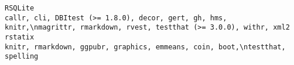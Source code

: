 \documentclass[
  letterpaper,
  DIV=11,
  numbers=noendperiod]{scrreprt}
\begin{document}
\begin{verbatim}
RSQLite                                                                                                                                                                                                                                                                                                                                                                                                                                                                                                                                                                                                                                                                                                                                                                                                                                                                                                                                                                                                                                                                                                                                                                            callr, cli, DBItest (>= 1.8.0), decor, gert, gh, hms, knitr,\nmagrittr, rmarkdown, rvest, testthat (>= 3.0.0), withr, xml2
rstatix                                                                                                                                                                                                                                                                                                                                                                                                                                                                                                                                                                                                                                                                                                                                                                                                                                                                                                                                                                                                                                                                                                                                                                                                                          knitr, rmarkdown, ggpubr, graphics, emmeans, coin, boot,\ntestthat, spelling

\end{verbatim}
\end{document}
